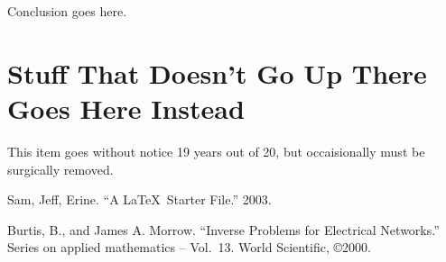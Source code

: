 \documentclass{amsart}
\theoremstyle{definition} %
\begin{document}
Conclusion goes here.

\appendix

\section{Stuff That Doesn't Go Up There Goes Here Instead}

This item goes without notice 19 years out of 20, but occaisionally
must be surgically removed.


\begin{thebibliography}{99}

Sam, Jeff, Erine.  ``A \LaTeX\ Starter File.''  2003.

Burtis, B., and James A. Morrow.  ``Inverse Problems
for Electrical Networks.''  Series on applied mathematics -- Vol.\ 13.
World Scientific, \copyright 2000.

\end{thebibliography}
\end{document}
